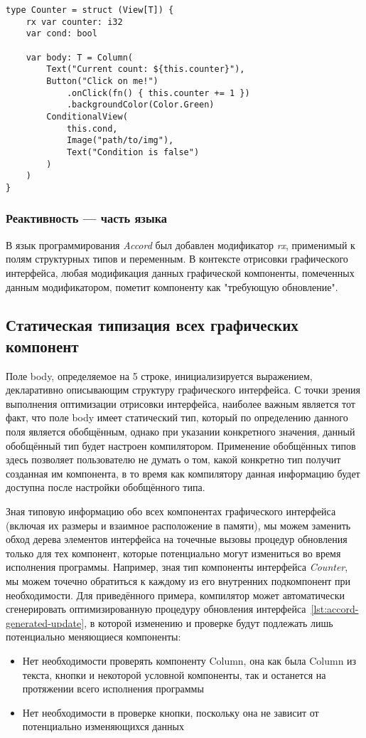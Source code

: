 \begin{lstlisting}[language=my_pseudo,caption=Счётчик нажатия кнопки на модифицированном языке \name{Accord},label={lst:accord-example}]
type Counter = struct (View[T]) {
    rx var counter: i32
    var cond: bool
    
    var body: T = Column(
        Text("Current count: ${this.counter}"),
        Button("Click on me!")
            .onClick(fn() { this.counter += 1 })
            .backgroundColor(Color.Green)
        ConditionalView(
            this.cond,
            Image("path/to/img"),
            Text("Condition is false")
        )
    )
}
\end{lstlisting}

\subsubsection*{Реактивность --- часть языка}
В язык программирования \textit{Accord} был добавлен модификатор
\textit{rx}, применимый к полям структурных типов и переменным. В контексте
отрисовки графического интерфейса, любая модификация данных графической
компоненты, помеченных данным модификатором, пометит компоненту как
"требующую обновление".

\subsection*{Статическая типизация всех графических компонент}
Поле body, определяемое на 5 строке, инициализируется выражением,
декларативно описывающим структуру графического интерфейса.
С точки зрения выполнения оптимизации отрисовки интерфейса, наиболее важным
является тот факт, что поле body имеет статический тип, который по
определению данного поля является обобщённым, однако при указании
конкретного значения, данный обобщённый тип будет настроен компилятором.
Применение обобщённых типов здесь позволяет пользователю не думать о том,
какой конкретно тип получит созданная им компонента, в то время как
компилятору данная информацию будет доступна после настройки обобщённого
типа.

Зная типовую информацию обо всех компонентах графического интерфейса
(включая их размеры и взаимное расположение в памяти), мы можем заменить
обход дерева элементов интерфейса на точечные вызовы процедур обновления
только для тех компонент, которые потенциально могут измениться во время
исполнения программы. Например, зная тип компоненты интерфейса
\textit{Counter}, мы можем точечно обратиться к каждому из его внутренних
подкомпонент при необходимости. Для приведённого примера, компилятор может
автоматически сгенерировать оптимизированную процедуру обновления
интерфейса~\ref{lst:accord-generated-update}, в которой изменению и проверке
будут подлежать лишь потенциально меняющиеся компоненты:
\begin{itemize}
	\item Нет необходимости проверять компоненту Column, она как была Column
	из текста, кнопки и некоторой условной компоненты, так и останется на
	протяжении всего исполнения программы
	\item Нет необходимости в проверке кнопки, поскольку она не зависит от
	потенциально изменяющихся данных
\end{itemize}

